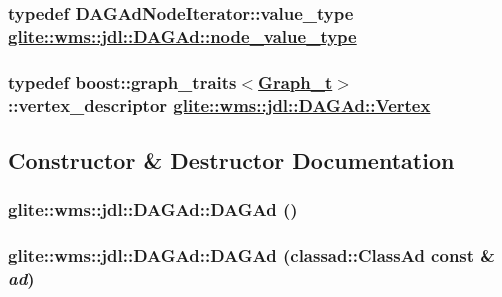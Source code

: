\hypertarget{classglite_1_1wms_1_1jdl_1_1DAGAd_w1}{
\subsubsection[node\_\-value\_\-type]{\setlength{\rightskip}{0pt plus 5cm}typedef DAGAd\-Node\-Iterator::value\_\-type \hyperlink{classglite_1_1wms_1_1jdl_1_1DAGAd_w1}{glite::wms::jdl::DAGAd::node\_\-value\_\-type}}}
\label{classglite_1_1wms_1_1jdl_1_1DAGAd_w1}


\hypertarget{classglite_1_1wms_1_1jdl_1_1DAGAd_w5}{
\subsubsection[Vertex]{\setlength{\rightskip}{0pt plus 5cm}typedef boost::graph\_\-traits$<$\hyperlink{classglite_1_1wms_1_1jdl_1_1DAGAd_w4}{Graph\_\-t}$>$::vertex\_\-descriptor \hyperlink{classglite_1_1wms_1_1jdl_1_1DAGAd_w5}{glite::wms::jdl::DAGAd::Vertex}}}
\label{classglite_1_1wms_1_1jdl_1_1DAGAd_w5}




\subsection{Constructor \& Destructor Documentation}
\hypertarget{classglite_1_1wms_1_1jdl_1_1DAGAd_a0}{
\subsubsection[DAGAd]{\setlength{\rightskip}{0pt plus 5cm}glite::wms::jdl::DAGAd::DAGAd ()}}
\label{classglite_1_1wms_1_1jdl_1_1DAGAd_a0}


\hypertarget{classglite_1_1wms_1_1jdl_1_1DAGAd_a1}{
\subsubsection[DAGAd]{\setlength{\rightskip}{0pt plus 5cm}glite::wms::jdl::DAGAd::DAGAd (classad::Class\-Ad const \& {\em ad})}}
\label{classglite_1_1wms_1_1jdl_1_1DAGAd_a1}





